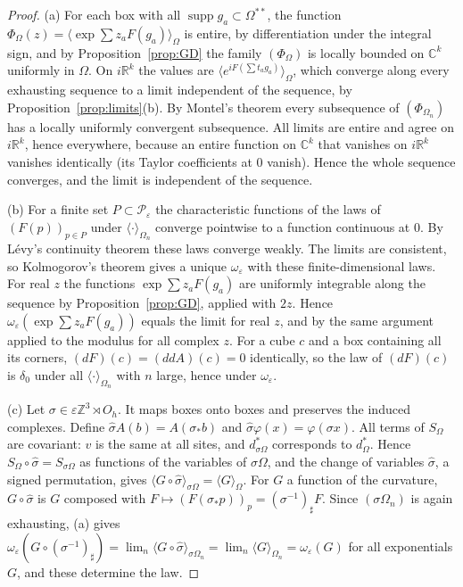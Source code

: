 \documentclass[11pt]{amsart}
\theoremstyle{plain}
\theoremstyle{definition}
\theoremstyle{remark}
\numberwithin{equation}{section}
\newcommand{\R}{\mathbb{R}}
\newcommand{\Z}{\mathbb{Z}}
\newcommand{\C}{\mathbb{C}}
\newcommand{\eps}{\varepsilon}
\newcommand{\cP}{\mathcal{P}}
\newcommand{\Oh}{O_h}
\newcommand{\ev}[1]{\langle #1\rangle}
\DeclareMathOperator{\supp}{supp}
\begin{document}
\begin{proof}
(a) For each box with all $\supp g_a\subset\Omega^{**}$, the function $\Phi_\Omega(z)=\ev{\exp\sum z_aF(g_a)}_\Omega$ is entire, by differentiation under the integral sign, and by Proposition~\ref{prop:GD} the family $(\Phi_\Omega)$ is locally bounded on $\C^k$ uniformly in $\Omega$. On $i\R^k$ the values are $\ev{e^{iF(\sum t_ag_a)}}_\Omega$, which converge along every exhausting sequence to a limit independent of the sequence, by Proposition~\ref{prop:limits}(b). By Montel's theorem every subsequence of $(\Phi_{\Omega_n})$ has a locally uniformly convergent subsequence. All limits are entire and agree on $i\R^k$, hence everywhere, because an entire function on $\C^k$ that vanishes on $i\R^k$ vanishes identically (its Taylor coefficients at $0$ vanish). Hence the whole sequence converges, and the limit is independent of the sequence.

(b) For a finite set $P\subset\cP_\eps$ the characteristic functions of the laws of $(F(p))_{p\in P}$ under $\ev\cdot_{\Omega_n}$ converge pointwise to a function continuous at $0$. By L\'evy's continuity theorem these laws converge weakly. The limits are consistent, so Kolmogorov's theorem gives a unique $\omega_\eps$ with these finite-dimensional laws. For real $z$ the functions $\exp\sum z_aF(g_a)$ are uniformly integrable along the sequence by Proposition~\ref{prop:GD}, applied with $2z$. Hence $\omega_\eps(\exp\sum z_aF(g_a))$ equals the limit for real $z$, and by the same argument applied to the modulus for all complex $z$. For a cube $c$ and a box containing all its corners, $(dF)(c)=(ddA)(c)=0$ identically, so the law of $(dF)(c)$ is $\delta_0$ under all $\ev\cdot_{\Omega_n}$ with $n$ large, hence under $\omega_\eps$.

(c) Let $\sigma\in\eps\Z^3\rtimes\Oh$. It maps boxes onto boxes and preserves the induced complexes. Define $\hat\sigma A(b)=A(\sigma_*b)$ and $\hat\sigma\varphi(x)=\varphi(\sigma x)$. All terms of $S_\Omega$ are covariant: $v$ is the same at all sites, and $d^*_{\sigma\Omega}$ corresponds to $d^*_\Omega$. Hence $S_\Omega\circ\hat\sigma=S_{\sigma\Omega}$ as functions of the variables of $\sigma\Omega$, and the change of variables $\hat\sigma$, a signed permutation, gives $\ev{G\circ\hat\sigma}_{\sigma\Omega}=\ev G_\Omega$. For $G$ a function of the curvature, $G\circ\hat\sigma$ is $G$ composed with $F\mapsto(F(\sigma_*p))_p=(\sigma^{-1})_\sharp F$. Since $(\sigma\Omega_n)$ is again exhausting, (a) gives $\omega_\eps(G\circ(\sigma^{-1})_\sharp)=\lim_n\ev{G\circ\hat\sigma}_{\sigma\Omega_n}=\lim_n\ev G_{\Omega_n}=\omega_\eps(G)$ for all exponentials $G$, and these determine the law.


\end{proof}
\end{document}
